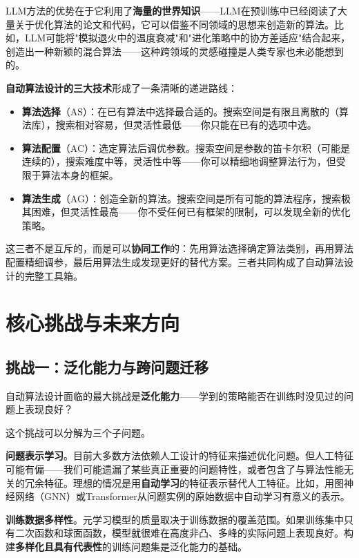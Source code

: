 \documentclass[lang=cn,zihao=-4,a4paper,fontset=windows]{beautybook}
\begin{document}
LLM方法的优势在于它利用了\textbf{海量的世界知识}——LLM在预训练中已经阅读了大量关于优化算法的论文和代码，它可以借鉴不同领域的思想来创造新的算法。比如，LLM可能将"模拟退火中的温度衰减"和"进化策略中的协方差适应"结合起来，创造出一种新颖的混合算法——这种跨领域的灵感碰撞是人类专家也未必能想到的。

\begin{fancybox}
\textbf{自动算法设计的三大技术}形成了一条清晰的递进路线：
\begin{itemize}
    \item \textbf{算法选择}（AS）：在已有算法中选择最合适的。搜索空间是有限且离散的（算法库），搜索相对容易，但灵活性最低——你只能在已有的选项中选。
    \item \textbf{算法配置}（AC）：选定算法后调优参数。搜索空间是参数的笛卡尔积（可能是连续的），搜索难度中等，灵活性中等——你可以精细地调整算法行为，但受限于算法本身的框架。
    \item \textbf{算法生成}（AG）：创造全新的算法。搜索空间是所有可能的算法程序，搜索极其困难，但灵活性最高——你不受任何已有框架的限制，可以发现全新的优化策略。
\end{itemize}
这三者不是互斥的，而是可以\textbf{协同工作}的：先用算法选择确定算法类别，再用算法配置精细调参，最后用算法生成发现更好的替代方案。三者共同构成了自动算法设计的完整工具箱。
\end{fancybox}

\section{核心挑战与未来方向}

\subsection{挑战一：泛化能力与跨问题迁移}

自动算法设计面临的最大挑战是\textbf{泛化能力}——学到的策略能否在训练时没见过的问题上表现良好？

这个挑战可以分解为三个子问题。

\textbf{问题表示学习}。目前大多数方法依赖人工设计的特征来描述优化问题。但人工特征可能有偏——我们可能遗漏了某些真正重要的问题特性，或者包含了与算法性能无关的冗余特征。理想的情况是用\textbf{自动学习}的特征表示替代人工特征。比如，用图神经网络（GNN）或Transformer从问题实例的原始数据中自动学习有意义的表示。

\textbf{训练数据多样性}。元学习模型的质量取决于训练数据的覆盖范围。如果训练集中只有二次函数和球面函数，模型就很难在高度非凸、多峰的实际问题上表现良好。构建\textbf{多样化且具有代表性}的训练问题集是泛化能力的基础。
\end{document}
